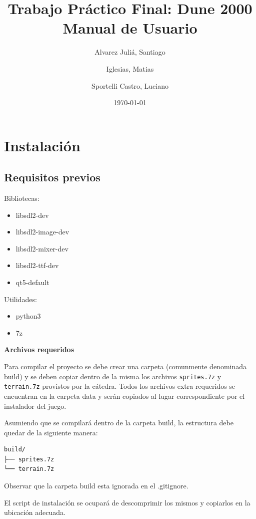 \documentclass[titlepage,a4paper,12pt]{article}
\title{ Trabajo Práctico Final: Dune 2000 \\ 
 \large{Manual de Usuario}}
\author{Alvarez Juliá, Santiago \and Iglesias, Matias \and Sportelli Castro, Luciano}
\date{ \today }
\begin{document}
\maketitle

\tableofcontents %

\newpage
\section{Instalación}
\subsection{Requisitos previos}
Bibliotecas:

\begin{itemize}
\item libsdl2-dev
\item libsdl2-image-dev
\item libsdl2-mixer-dev
\item libsdl2-ttf-dev
\item qt5-default
\end{itemize}

Utilidades:

\begin{itemize}
\item python3
\item 7z
\end{itemize}

\textbf{Archivos requeridos}

Para compilar el proyecto se debe crear una carpeta (comunmente denominada build) y se deben copiar dentro de la misma los archivos \texttt{sprites.7z} y \texttt{terrain.7z} provistos por la cátedra. Todos los archivos extra requeridos se encuentran en la carpeta data y serán copiados al lugar correspondiente por el instalador del juego.

Asumiendo que se compilará dentro de la carpeta build, la estructura debe quedar de la siguiente manera:

\begin{verbatim}
build/
├── sprites.7z
└── terrain.7z
\end{verbatim}

Observar que la carpeta build esta ignorada en el .gitignore.

El script de instalación se ocupará de descomprimir los mismos y copiarlos en la ubicación adecuada.
\end{document}
